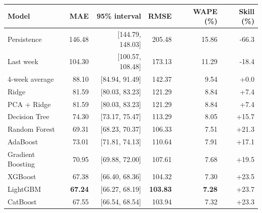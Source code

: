 \begin{tabular}{lrrrrr}
\toprule
Model & MAE & 95\% interval & RMSE & WAPE (\%) & Skill (\%) \\
\midrule
Persistence & 146.48 & {\small [144.79, 148.03]} & 205.48 & 15.86 & -66.3 \\
Last week & 104.30 & {\small [100.57, 108.48]} & 173.13 & 11.29 & -18.4 \\
4-week average & 88.10 & {\small [84.94, 91.49]} & 142.37 & 9.54 & +0.0 \\
\midrule
Ridge & 81.59 & {\small [80.03, 83.23]} & 121.29 & 8.84 & +7.4 \\
PCA + Ridge & 81.59 & {\small [80.03, 83.23]} & 121.29 & 8.84 & +7.4 \\
Decision Tree & 74.30 & {\small [73.17, 75.47]} & 113.29 & 8.05 & +15.7 \\
Random Forest & 69.31 & {\small [68.23, 70.37]} & 106.33 & 7.51 & +21.3 \\
AdaBoost & 73.01 & {\small [71.81, 74.13]} & 110.64 & 7.91 & +17.1 \\
Gradient Boosting & 70.95 & {\small [69.88, 72.00]} & 107.61 & 7.68 & +19.5 \\
XGBoost & 67.38 & {\small [66.40, 68.36]} & 104.32 & 7.30 & +23.5 \\
LightGBM & \textbf{67.24} & {\small [66.27, 68.19]} & \textbf{103.83} & \textbf{7.28} & +23.7 \\
CatBoost & 67.55 & {\small [66.54, 68.54]} & 103.94 & 7.32 & +23.3 \\
\bottomrule
\end{tabular}
